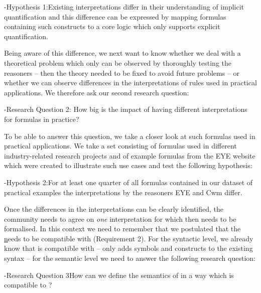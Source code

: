 \hyp{\hypertarget{h2}{Hypothesis 1:}}{Existing interpretations differ in their understanding of implicit quantification and this difference can be 
expressed by mapping formulas containing such constructs to a core logic which only supports explicit quantification.}

Being aware of this difference, we next want to know whether we deal with a theoretical problem which only can be observed by thoroughly testing the reasoners 
-- then the theory needed to be fixed to avoid future problems -- or whether we can observe differences in the interpretations of \nthree 
rules used in practical applications. We therefore ask our second research question:

\hyp{\hypertarget{rq3}{Research Question 2:}}{
How big is the impact of having different interpretations for \nthree formulas in practice?
}

To be able to answer this question, we take a closer look at such \nthree formulas used in practical applications. We take a set consisting of formulas used in different industry-related 
research projects and of example formulas from the EYE website which were created to illustrate such use cases and test the following hypothesis:

\hyp{Hypothesis 2:}{For at least one quarter of all \nthree formulas contained in our dataset of practical examples the interpretations by the reasoners EYE and Cwm differ.}

Once the differences in the interpretations can be clearly identified, the community needs to agree on \emph{one} interpretation for \nthreelogic which then needs 
to be formalised. In this context we need to remember that we postulated that the \ul needs to be compatible with \rdf (Requirement 2).
% 
For the syntactic level, we already know that \nthree is compatible with \rdf{} -- \nthree only adds symbols and constructs to the existing \rdf syntax --
for the semantic level we need to answer the following research question:

\hyp{Research Question 3}{How can we define the semantics of \nthreelogic in a way which is compatible to \rdf?}

